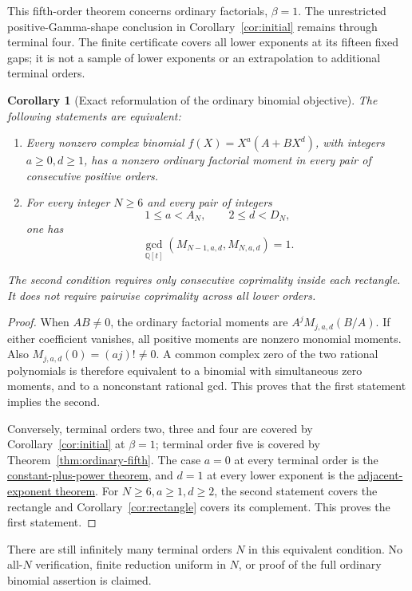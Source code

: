 \documentclass[11pt]{article}
\newtheorem{corollary}[theorem]{Corollary}
\begin{document}
This fifth-order theorem concerns ordinary factorials, $\beta=1$.
The unrestricted positive-Gamma-shape conclusion in
Corollary~\ref{cor:initial} remains through terminal four.
The finite certificate covers all lower exponents at its fifteen
fixed gaps; it is not a sample of lower exponents or an
extrapolation to additional terminal orders.

\begin{corollary}[Exact reformulation of the ordinary binomial objective]
\label{cor:full-objective}
The following statements are equivalent:
\begin{enumerate}
\item Every nonzero complex binomial $f(X)=X^a(A+BX^d)$,
with integers $a\ge0,d\ge1$, has a nonzero ordinary factorial moment
in every pair of consecutive positive orders.
\item For every integer $N\ge6$ and every pair of integers
\[
 1\le a<A_N,\qquad 2\le d<D_N,
\]
one has
\[
 \gcd_{\mathbb Q[t]}(M_{N-1,a,d},M_{N,a,d})=1.
\]
\end{enumerate}
The second condition requires only consecutive coprimality inside each
rectangle. It does not require pairwise coprimality across all lower
orders.
\end{corollary}
\begin{proof}
When $AB\ne0$, the ordinary factorial moments are
$A^j M_{j,a,d}(B/A)$. If either coefficient vanishes, all positive
moments are nonzero monomial moments. Also
$M_{j,a,d}(0)=(aj)!\ne0$.
A common complex zero of the two rational polynomials is therefore
equivalent to a binomial with simultaneous zero moments, and to a
nonconstant rational gcd. This proves that the first statement implies
the second.

Conversely, terminal orders two, three and four are covered by
Corollary~\ref{cor:initial} at $\beta=1$; terminal order five is covered by Theorem~\ref{thm:ordinary-fifth}.
The case $a=0$ at every terminal order is the
\href{ALL_UNIVARIATE_TWO_TERM_SFC.tex}{constant-plus-power theorem},
and $d=1$ at every lower exponent is the
\href{UNIFORM_PADE_PARABOLA_SFC.tex}{adjacent-exponent theorem}.
For $N\ge6,a\ge1,d\ge2$, the second statement covers the rectangle
and Corollary~\ref{cor:rectangle} covers its complement.
This proves the first statement.
\end{proof}
There are still infinitely many terminal orders $N$ in this equivalent
condition. No all-$N$ verification, finite reduction uniform in $N$, or
proof of the full ordinary binomial assertion is claimed.
\end{document}
